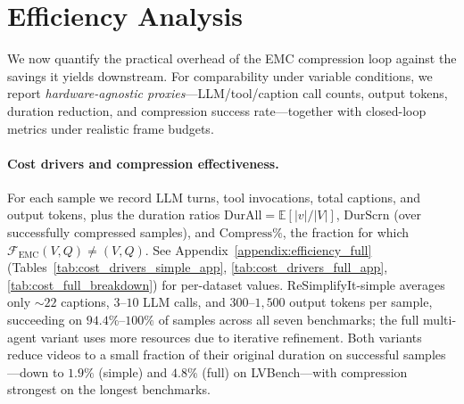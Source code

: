 \section{Efficiency Analysis}
\label{sec:efficiency}

We now quantify the practical overhead of the EMC compression loop against the savings it yields downstream. For comparability under variable conditions, we report \textit{hardware-agnostic proxies}---LLM/tool/caption call counts, output tokens, duration reduction, and compression success rate---together with closed-loop metrics under realistic frame budgets.

\paragraph{Cost drivers and compression effectiveness.}
For each sample we record LLM turns, tool invocations, total captions, and output tokens, plus the duration ratios $\mathrm{DurAll} = \mathbb{E}[|v|/|V|]$, $\mathrm{DurScrn}$ (over successfully compressed samples), and $\mathrm{Compress\%}$, the fraction for which $\mathcal{F}_{\mathrm{EMC}}(V,Q) \ne (V,Q)$. See Appendix~\ref{appendix:efficiency_full} (Tables~\ref{tab:cost_drivers_simple_app}, \ref{tab:cost_drivers_full_app}, \ref{tab:cost_full_breakdown}) for per-dataset values. ReSimplifyIt-simple averages only ${\sim}22$ captions, $3$--$10$ LLM calls, and $300$--$1{,}500$ output tokens per sample, succeeding on $94.4\%$--$100\%$ of samples across all seven benchmarks; the full multi-agent variant uses more resources due to iterative refinement. Both variants reduce videos to a small fraction of their original duration on successful samples---down to $1.9\%$ (simple) and $4.8\%$ (full) on LVBench---with compression strongest on the longest benchmarks.

